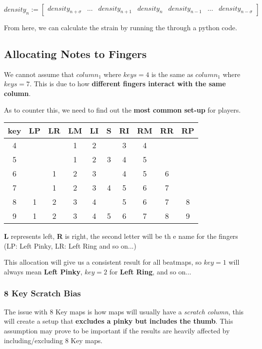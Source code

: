 $$
density_n :=
\begin{bmatrix}
	density_{n+\sigma} & \dots & density_{n+1} & density_{n} & density_{n-1} & \dots & density_{n-\sigma} 
\end{bmatrix}
$$ 

From here, we can calculate the strain by running the through a python code.

\subsection{Allocating Notes to Fingers}

We cannot assume that $column_1$ where $keys = 4$ is the same as $column_1$ where $keys = 7$. This is due to how \textbf{different fingers interact with the same column}.

As to counter this, we need to find out the \textbf{most common set-up} for players.

\begin{center}
	\begin{tabular}{|c|c|c|c|c|c|c|c|c|c|} 
	\hline
	key & LP & LR & LM & LI & S  & RI & RM & RR & RP\\
	\hline
	4   & {} & {} & 1  & 2  & {} & 3  & 4  & {} & {}\\
	5   & {} & {} & 1  & 2  & 3  & 4  & 5  & {} & {}\\
	6   & {} & 1  & 2  & 3  & {} & 4  & 5  & 6  & {}\\
	7   & {} & 1  & 2  & 3  & 4  & 5  & 6  & 7  & {}\\
	8   & 1  & 2  & 3  & 4  & {} & 5  & 6  & 7  & 8\\
	9   & 1  & 2  & 3  & 4  & 5  & 6  & 7  & 8  & 9\\
	\hline
\end{tabular}
\end{center}

\textbf{L} represents left, \textbf{R} is right, the second letter will be th	e name for the fingers (LP: Left Pinky, LR: Left Ring and so on...)

This allocation will give us a consistent result for all beatmaps, so $key=1$ will always mean \textbf{Left Pinky}, $key=2$ for \textbf{Left Ring}, and so on...

\subsubsection{8 Key Scratch Bias}
The issue with 8 Key maps is how maps will usually have a \textit{scratch column}, this will create a setup that \textbf{excludes a pinky but includes the thumb}. This assumption may prove to be important if the results are heavily affected by including/excluding 8 Key maps.

